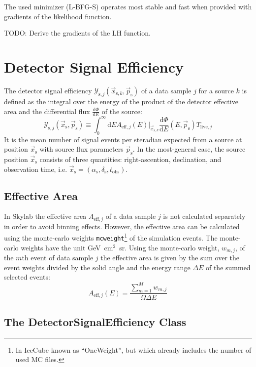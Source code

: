 \documentclass{article}
\newcommand{\code}[1]{\texttt{#1}}
\newcommand{\ps}{\vec{p}_{\mathrm{s}}}
\newcommand{\xs}{\vec{x}_{\mathrm{s}}}
\newcommand{\xsk}{\vec{x}_{\mathrm{s},k}}
\begin{document}
The used minimizer (L-BFG-S) operates most stable and fast when provided with
gradients of the likelihood function.

TODO: Derive the gradients of the LH function.

\section{Detector Signal Efficiency}

The detector signal efficiency $\mathcal{Y}_{\mathrm{s},j}(\vec{x}_{\mathrm{s},k},\ps)$
of a data sample $j$ for a source $k$ is defined as the integral over the energy
of the product of the detector effective area and the differential flux
$\frac{\mathrm{d}\Phi}{\mathrm{d}E}$ of the source:
\begin{equation}
 \mathcal{Y}_{\mathrm{s},j}(\xs,\ps) \equiv \int_0^\infty \mathrm{d}E A_{\mathrm{eff},j}(E)|_{\xsk} \frac{\mathrm{d}\Phi}{\mathrm{d}E}(E,\ps) T_{\mathrm{live},j}
\label{eq:Ysj}
\end{equation}
It is the mean number of signal events per steradian expected from a source at
position $\xs$ with source flux parameters $\ps$. In the most-general case,
the source position $\xs$ consists of three quantities: right-ascention,
declination, and observation time, i.e.
$\xs = (\alpha_{\mathrm{s}},\delta_{\mathrm{s}},t_{\mathrm{obs}})$.

\subsection{Effective Area}

In Skylab the effective area $A_{\mathrm{eff},j}$ of a data sample $j$ is not
calculated separately in order to avoid binning effects. However, the effective
area can be calculated using the monte-carlo weights \code{mcweight}\footnote{In IceCube
known as ``OneWeight'', but which already includes the number of used MC files.}
of the simulation events.
The monte-carlo weights have the unit GeV~cm$^2$~sr.
Using the monte-carlo weight, $w_{m,j}$, of the $m$th event of data sample $j$
the effective area is given by the sum over the event weights divided by the
solid angle and the energy range $\Delta E$ of the summed selected events:
\begin{equation}
 A_{\mathrm{eff},j}(E) = \frac{\sum_{m=1}^{M} w_{m,j}}{\Omega \Delta E}
\end{equation}


\subsection{The DetectorSignalEfficiency Class}
\end{document}
